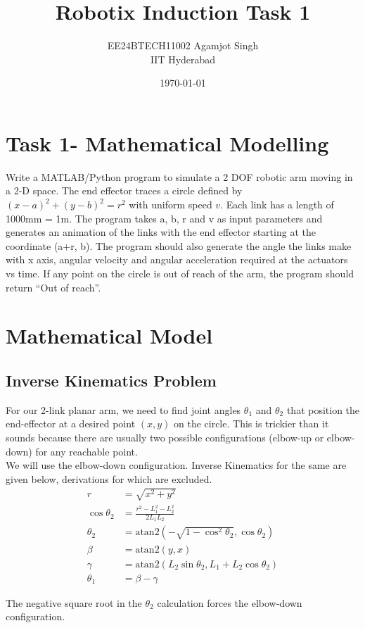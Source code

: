 \documentclass{article}
\title{Robotix Induction Task 1}
\author{EE24BTECH11002 Agamjot Singh\\IIT Hyderabad}
\date{\today}
\begin{document}
\maketitle

\section*{Task 1- Mathematical Modelling}
Write a MATLAB/Python program to simulate a 2 DOF robotic arm moving in a 2-D space. The end effector traces a circle defined by $(x-a)^2+(y-b)^2=r^2$ with uniform speed $v$. Each link has a length of 1000mm = 1m. The program takes a, b, r and v as input parameters and generates an animation of the links with the end effector starting at the coordinate (a+r, b). The program should also generate the angle the links make with x axis, angular velocity and angular acceleration required at the actuators vs time. If any point on the circle is out of reach of the arm, the program should return “Out of reach”. 

\section*{Mathematical Model}

\subsection*{Inverse Kinematics Problem}
For our 2-link planar arm, we need to find joint angles $\theta_1$ and $\theta_2$ that position the end-effector at a desired point $(x,y)$ on the circle. This is trickier than it sounds because there are usually two possible configurations (elbow-up or elbow-down) for any reachable point. \\
We will use the elbow-down configuration. Inverse Kinematics for the same are given below, derivations for which are excluded.
\begin{align}
r &= \sqrt{x^2 + y^2} \\
\cos\theta_2 &= \frac{r^2 - L_1^2 - L_2^2}{2L_1L_2} \\
\theta_2 &= \text{atan2}(-\sqrt{1-\cos^2\theta_2}, \cos\theta_2) \\
\beta &= \text{atan2}(y, x) \\
\gamma &= \text{atan2}(L_2\sin\theta_2, L_1 + L_2\cos\theta_2) \\
\theta_1 &= \beta - \gamma
\end{align}

The negative square root in the $\theta_2$ calculation forces the elbow-down configuration.
\end{document}
